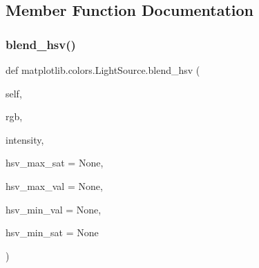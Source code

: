 \subsection{Member Function Documentation}
\mbox{\label{classmatplotlib_1_1colors_1_1LightSource_a5111ad7bc8b948ff94ed9995a9e25a11}} 
\subsubsection{\texorpdfstring{blend\+\_\+hsv()}{blend\_hsv()}}
{\footnotesize\ttfamily def matplotlib.\+colors.\+Light\+Source.\+blend\+\_\+hsv (\begin{DoxyParamCaption}\item[{}]{self,  }\item[{}]{rgb,  }\item[{}]{intensity,  }\item[{}]{hsv\+\_\+max\+\_\+sat = {\ttfamily None},  }\item[{}]{hsv\+\_\+max\+\_\+val = {\ttfamily None},  }\item[{}]{hsv\+\_\+min\+\_\+val = {\ttfamily None},  }\item[{}]{hsv\+\_\+min\+\_\+sat = {\ttfamily None} }\end{DoxyParamCaption})}

